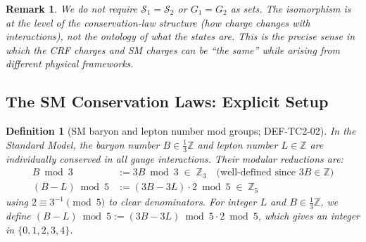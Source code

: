 \documentclass[12pt, a4paper]{article}
\newtheorem{definition}{Definition}[section]
\newtheorem{remark}{Remark}[section]
\begin{document}
\begin{remark}
We do not require $\mathcal{S}_1 = \mathcal{S}_2$ or $G_1 = G_2$
as sets. The isomorphism is at the level of the conservation-law
\emph{structure} (how charge changes with interactions), not the
ontology of what the states are. This is the precise sense in which
the CRF charges and SM charges can be ``the same'' while arising
from different physical frameworks.
\end{remark}

\subsection{The SM Conservation Laws: Explicit Setup}
\label{sec:sm-setup}

\begin{definition}[SM baryon and lepton number mod groups; DEF-TC2-02]
\label{def:BL-mod}
In the Standard Model, the baryon number $B \in \frac{1}{3}\mathbb{Z}$
and lepton number $L \in \mathbb{Z}$ are individually conserved in all
gauge interactions. Their modular reductions are:
\begin{align}
  B \bmod 3 &:= 3B \bmod 3 \;\in\; \mathbb{Z}_3
  \quad \text{(well-defined since $3B \in \mathbb{Z}$)}
  \label{eq:Bmod3} \\
  (B-L) \bmod 5 &:= (3B - 3L) \cdot 2 \bmod 5 \;\in\; \mathbb{Z}_5
  \label{eq:BLmod5}
\end{align}
using $2 \equiv 3^{-1} \pmod{5}$ to clear denominators. For integer
$L$ and $B \in \frac{1}{3}\mathbb{Z}$, we define
$(B-L)\bmod 5 := (3B - 3L)\bmod 5 \cdot 2 \bmod 5$,
which gives an integer in $\{0,1,2,3,4\}$.
\end{definition}
\end{document}
